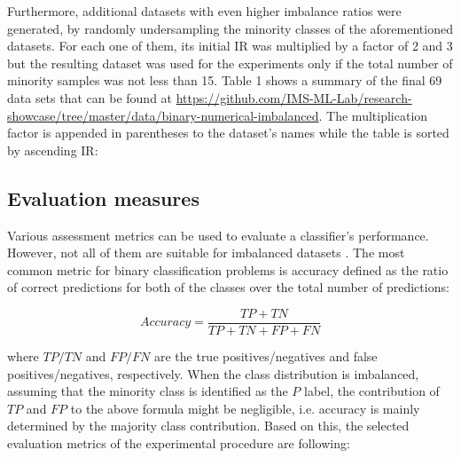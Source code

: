 \documentclass[parskip=full]{scrartcl}
\begin{document}
 Furthermore, additional datasets with even higher imbalance ratios were generated, by randomly undersampling the minority classes of the aforementioned datasets. For each one of them, its initial IR was multiplied by a factor of 2 and 3 but the resulting dataset was used for the experiments only if the total number of minority samples was not less than 15. Table 1 shows a summary of the final 69 data sets that can be found at \url{https://github.com/IMS-ML-Lab/research-showcase/tree/master/data/binary-numerical-imbalanced}. The multiplication factor is appended in parentheses to the dataset's names while the table is sorted by ascending IR:


\subsection{Evaluation measures}

Various assessment metrics can be used to evaluate a classifier's performance. However, not all of them are suitable for imbalanced datasets \cite{He2009}. The most common metric for binary classification problems is accuracy defined as the ratio of correct predictions for both of the classes over the total number of predictions:

$$Accuracy = \frac{TP + TN}{TP +TN + FP + FN}$$

where \(TP / TN\) and \(FP / FN\) are the true positives/negatives and false positives/negatives, respectively. When the class distribution is imbalanced, assuming that the minority class is identified as the \(P\) label, the contribution of \(TP\) and \(FP\) to the above formula might be negligible, i.e. accuracy is mainly determined by the majority class contribution. Based on this, the selected evaluation metrics of the experimental procedure are following:
\end{document}
